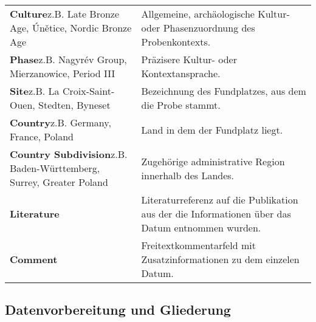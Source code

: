 \documentclass[openany,twoside,twocolumn]{book}
\begin{document}
\begin{table}
\begin{tabular}[t]{>{\raggedright\arraybackslash}p{20em}>{\raggedright\arraybackslash}p{25em}}
\addlinespace
\textbf{Culture}\newline z.B. Late Bronze Age, Únětice, Nordic Bronze Age & Allgemeine, archäologische Kultur- oder Phasenzuordnung des Probenkontexts.\\
\textbf{Phase}\newline z.B. Nagyrév Group, Mierzanowice, Period III & Präzisere Kultur- oder Kontextansprache.\\
\textbf{Site}\newline z.B. La Croix-Saint-Ouen, Stedten, Byneset & Bezeichnung des Fundplatzes, aus dem die Probe stammt.\\
\textbf{Country}\newline z.B. Germany, France, Poland & Land in dem der Fundplatz liegt.\\
\textbf{Country Subdivision}\newline z.B. Baden-Württemberg, Surrey, Greater Poland & Zugehörige administrative Region innerhalb des Landes.\\
\addlinespace
\textbf{Literature}\newline  & Literaturreferenz auf die Publikation aus der die Informationen über das Datum entnommen wurden.\\
\textbf{Comment}\newline  & Freitextkommentarfeld mit Zusatzinformationen zu dem einzelen Datum.\\
\bottomrule
\end{tabular}
\end{table}

\hypertarget{data-prep-and-segmentation}{%
\subsection{Datenvorbereitung und
Gliederung}\label{data-prep-and-segmentation}}
\end{document}
